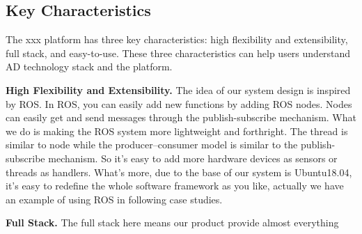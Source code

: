 \documentclass[conference]{IEEEtran}
\begin{document}
\subsection{Key Characteristics}
The xxx platform has three key characteristics: high flexibility and extensibility, full stack, and easy-to-use. These three characteristics can help users understand AD technology stack and the platform.

\textbf{High Flexibility and Extensibility. }The idea of our system design is inspired by ROS. In ROS, you can easily add new functions by adding ROS nodes. Nodes can easily get and send messages through the publish-subscribe mechanism. What we do is making the ROS system more lightweight and forthright. The thread is similar to node while the producer–consumer model is similar to the publish-subscribe mechanism. So it's easy to add more hardware devices as sensors or threads as handlers. What's more, due to the base of our system is Ubuntu18.04, it's easy to redefine the whole software framework as you like, actually we have an example of using ROS in following case studies.

\textbf{Full Stack. }The full stack here means our product provide almost everything 
\end{document}
